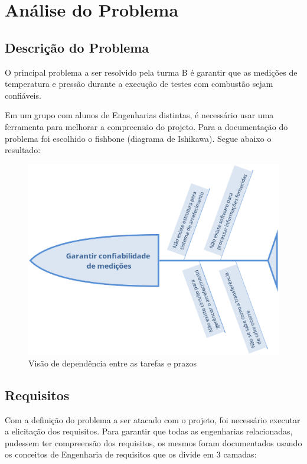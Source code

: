 \chapter{Análise do Problema}
\section{Descrição do Problema}
O principal problema a ser resolvido pela turma B é garantir que as medições de temperatura e pressão durante a execução de testes com combustão sejam confiáveis.

Em um grupo com alunos de Engenharias distintas, é necessário usar uma ferramenta para melhorar a compreensão do projeto. Para a documentação do problema foi escolhido o fishbone (diagrama de Ishikawa). Segue abaixo o resultado:

\begin{figure}[!htb]                                                               
   \centering                                                                      
   \includegraphics[width=15cm, keepaspectratio=true]{figuras/fishbone.eps}
   \caption{Visão de dependência entre as tarefas e prazos}                        
\end{figure}

\section{Requisitos}
Com a definição do problema a ser atacado com o projeto, foi necessário executar a elicitação dos requisitos. Para garantir que todas as engenharias relacionadas, pudessem ter compreensão dos requisitos, os mesmos foram documentados usando os conceitos de Engenharia de requisitos que os divide em 3 camadas:

